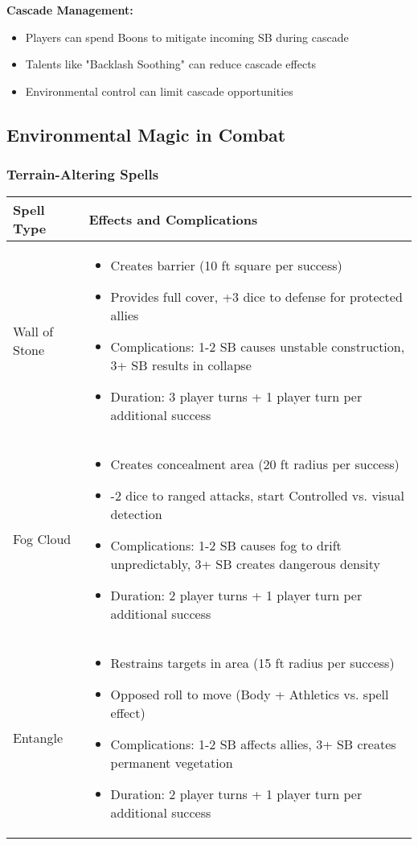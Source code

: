 \textbf{Cascade Management:}
\begin{itemize}[leftmargin=*]
    \item Players can spend Boons to mitigate incoming SB during cascade
    \item Talents like "Backlash Soothing" can reduce cascade effects
    \item Environmental control can limit cascade opportunities
\end{itemize}

\subsection{Environmental Magic in Combat}

\subsubsection{Terrain-Altering Spells}
\begin{longtable}{|>{\raggedright\arraybackslash}p{4cm}|>{\raggedright\arraybackslash}p{8cm}|}
\hline
\textbf{Spell Type} & \textbf{Effects and Complications} \\
\hline
Wall of Stone & 
\begin{itemize}
    \item Creates barrier (10 ft square per success)
    \item Provides full cover, +3 dice to defense for protected allies
    \item Complications: 1-2 SB causes unstable construction, 3+ SB results in collapse
    \item Duration: 3 player turns + 1 player turn per additional success
\end{itemize} \\
\hline
Fog Cloud & 
\begin{itemize}
    \item Creates concealment area (20 ft radius per success)
    \item -2 dice to ranged attacks, start Controlled vs. visual detection
    \item Complications: 1-2 SB causes fog to drift unpredictably, 3+ SB creates dangerous density
    \item Duration: 2 player turns + 1 player turn per additional success
\end{itemize} \\
\hline
Entangle & 
\begin{itemize}
    \item Restrains targets in area (15 ft radius per success)
    \item Opposed roll to move (Body + Athletics vs. spell effect)
    \item Complications: 1-2 SB affects allies, 3+ SB creates permanent vegetation
    \item Duration: 2 player turns + 1 player turn per additional success
\end{itemize} \\
\hline
\end{longtable}

